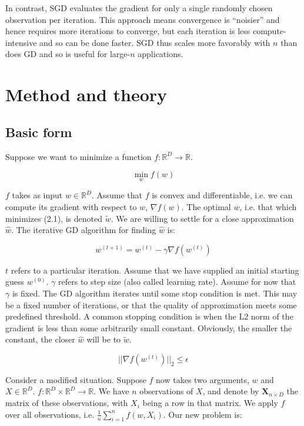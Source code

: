 \documentclass{report}
\begin{document}
In contrast, SGD evaluates the gradient for only a single randomly chosen observation per iteration. This
approach means convergence is ``noisier'' and hence requires more iterations to
converge, but each iteration is less compute-intensive and so can be done
faster. SGD thus scales more favorably with $n$ than does GD and so is
useful for large-$n$ applications.

\chapter{Method and theory}

\section{Basic form}

Suppose we want to minimize a function $f: \mathbb{R}^D \to \mathbb{R}$. 

\begin{equation}
	\min_w f(w)
\end{equation}

$f$ takes as input $w \in \mathbb{R}^D$. Assume
that $f$ is convex and differentiable, i.e. we can compute its gradient with
respect to $w$, $\nabla f(w)$. The optimal $w$, i.e. that which minimizes (2.1),
is denoted $\tilde{w}$. We are willing to settle for a close approximation
$\hat{w}$. The iterative GD algorithm for finding $\hat{w}$ is:

\begin{equation}
	w^{(t+1)} = w^{(t)} - \gamma \nabla f(w^{(t)})
\end{equation}

$t$ refers to a particular iteration. Assume that we have supplied an initial
starting guess $w^{(0)}$. $\gamma$ refers to step size (also called
learning rate). Assume for now that $\gamma$ is fixed. The GD algorithm iterates
until some stop condition is met. This may be a fixed number of iterations, or
that the quality of approximation meets some predefined threshold. 
A common stopping condition is when the L2 norm of the gradient
is less than some arbitrarily small constant. Obviously, the smaller the
constant, the closer $\hat{w}$ will be to $\tilde{w}$.

\begin{equation}
	||\nabla f(w^{(t)})||_2 \leq \epsilon
\end{equation}

Consider a modified situation. Suppose $f$ now takes two arguments, $w$ and $X
\in \mathbb{R}^D$. $f : \mathbb{R}^D \times \mathbb{R}^D \rightarrow
\mathbb{R}$. We have $n$ observations of $X$, and denote by
$\bm{X}_{n \times D}$ the matrix of these observations, with $X_i$ being a
row in that matrix. We apply $f$ over all observations, i.e. $\frac{1}{n} \sum_{i=1}^n f(w, X_i)$. Our new
problem is:
\end{document}
